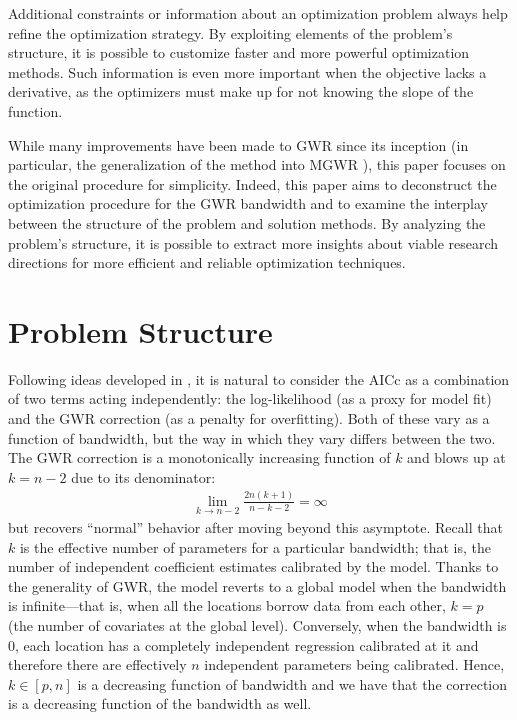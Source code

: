 \documentclass[letterpaper,12pt,twocolumn]{article}
\begin{document}
Additional constraints or information about an optimization problem always help refine the optimization strategy. By exploiting elements of the problem's structure, it is possible to customize faster and more powerful optimization methods. Such information is even more important when the objective lacks a derivative, as the optimizers must make up for not knowing the slope of the function.

While many improvements have been made to GWR since its inception (in particular, the generalization of the method into MGWR \cite{Oshan2019}), this paper focuses on the original procedure for simplicity. Indeed, this paper aims to deconstruct the optimization procedure for the GWR bandwidth and to examine the interplay between the structure of the problem and solution methods. By analyzing the problem's structure, it is possible to extract more insights about viable research directions for more efficient and reliable optimization techniques.

\section{Problem Structure}
\label{sec:problem}
Following ideas developed in \cite{Hoffman2021}, it is natural to consider the AICc as a combination of two terms acting independently: the log-likelihood (as a proxy for model fit) and the GWR correction (as a penalty for overfitting). Both of these vary as a function of bandwidth, but the way in which they vary differs between the two. The GWR correction is a monotonically increasing function of $k$ and blows up at $k = n-2$ due to its denominator: \begin{align*}
    \lim_{k\rightarrow n-2} \frac{2n(k+1)}{n-k-2} = \infty
\end{align*} but recovers ``normal'' behavior after moving beyond this asymptote. Recall that $k$ is the effective number of parameters for a particular bandwidth; that is, the number of independent coefficient estimates calibrated by the model. Thanks to the generality of GWR, the model reverts to a global model when the bandwidth is infinite---that is, when all the locations borrow data from each other, $k = p$ (the number of covariates at the global level). Conversely, when the bandwidth is 0, each location has a completely independent regression calibrated at it and therefore there are effectively $n$ independent parameters being calibrated. Hence, $k \in [p, n]$ is a decreasing function of bandwidth and we have that the correction is a decreasing function of the bandwidth as well.
\end{document}
